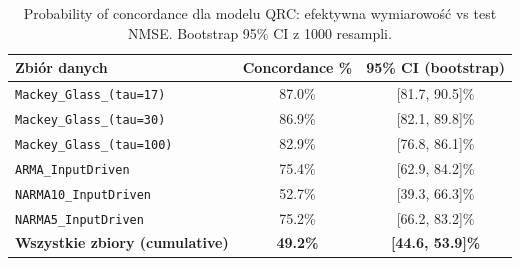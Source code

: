 \begin{table}[ht]
\centering
\caption{Probability of concordance dla modelu QRC: efektywna wymiarowość vs test NMSE. Bootstrap 95\% CI z 1000 resampli.}
\label{tab:concordance-qrc}
\begin{tabular}{lcc}
\toprule
Zbiór danych & Concordance \% & 95\% CI (bootstrap) \\
\midrule
\texttt{Mackey\_Glass\_(tau=17)} & 87.0\% & [81.7, 90.5]\% \\
\texttt{Mackey\_Glass\_(tau=30)} & 86.9\% & [82.1, 89.8]\% \\
\texttt{Mackey\_Glass\_(tau=100)} & 82.9\% & [76.8, 86.1]\% \\
\texttt{ARMA\_InputDriven} & 75.4\% & [62.9, 84.2]\% \\
\texttt{NARMA10\_InputDriven} & 52.7\% & [39.3, 66.3]\% \\
\texttt{NARMA5\_InputDriven} & 75.2\% & [66.2, 83.2]\% \\
\midrule
\textbf{Wszystkie zbiory (cumulative)} & \textbf{49.2\%} & \textbf{[44.6, 53.9]\%} \\
\bottomrule
\end{tabular}
\end{table}